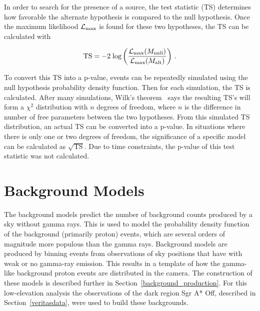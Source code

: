   In order to search for the presence of a source, the test statistic (TS) determines how favorable the alternate hypothesis is compared to the null hypothesis.
  Once the maximum likelihood $\mathcal{L}_{\textrm{max}}$ is found for these two hypotheses, the TS can be calculated with
  
  \begin{equation}\label{eqn:tscalc}
    \textrm{TS} = - 2 \; \textrm{log} \left (  \frac{ \mathcal{L}_{\textrm{max}}( M_\textrm{null} ) }{ \mathcal{L}_{\textrm{max}}( M_\textrm{alt} ) } \right ) \,.
  \end{equation}
  
  To convert this TS into a p-value, events can be repeatedly simulated using the null hypothesis probability density function.
  Then for each simulation, the TS is calculated.
  After many simulations, Wilk's theorem~\cite{wilks1938} says the resulting TS's will form a $\chi^2$ distribution with $n$ degrees of freedom, where $n$ is the difference in number of free parameters between the two hypotheses.
  From this simulated TS distribution, an actual TS can be converted into a p-value.
  In situations where there is only one or two degrees of freedom, the significance of a specific model can be calculated as $\sqrt{\textrm{TS}}$.
  Due to time constraints, the p-value of this test statistic was not calculated.
  

\section{Background Models}\label{sec:bkgmodels}
  The background models predict the number of background counts produced by a sky without gamma rays.
  This is used to model the probability density function of the background (primarily proton) events, which are several orders of magnitude more populous than the gamma rays.
  Background models are produced by binning events from observations of sky positions that have with weak or no gamma-ray emission.
  This results in a template of how the gamma-like background proton events are distributed in the camera.
  The construction of these models is described further in Section~\ref{background_production}.
  For this low-elevation analysis the observations of the dark region Sgr A* Off, described in Section~\ref{veritasdata}, were used to build these backgrounds.
  
